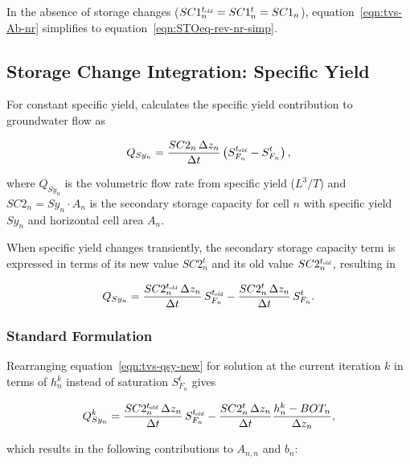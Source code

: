 \noindent In the absence of storage changes ($SC1_n^{t_\mathit{\kern -0.07em old}} = SC1_n^t = SC1_n$), equation~\ref{eqn:tvs-Ab-nr} simplifies to equation~\ref{eqn:STOeq-rev-nr-simp}.



\subsection{Storage Change Integration: Specific Yield} \label{sec:sci-sy}

For constant specific yield, \mf calculates the specific yield contribution to groundwater flow \citep[eq. 5--10]{modflow6gwf} as

\begin{equation}
	\label{eqn:tvs-qsy-original}
	Q_{Sy_n} = \frac{SC2_n \, \Delta z_n}{\Delta t} \left( S_{F_n}^{t_\mathit{\kern -0.07em old}} - S_{F_n}^t \right) ,
\end{equation}

\noindent where $Q_{Sy_n}$ is the volumetric flow rate from specific yield ($L^3/T$) and $SC2_n = Sy_n \cdot A_n$ is the secondary storage capacity for cell $n$ with specific yield $Sy_n$ and horizontal cell area $A_n$.

When specific yield changes transiently, the secondary storage capacity term is expressed in terms of its new value $SC2_n^t$ and its old value $SC2_n^{t_\mathit{\kern -0.07em old}}$, resulting in

\begin{equation}
	\label{eqn:tvs-qsy-new}
	Q_{Sy_n} = \frac{SC2_n^{t_\mathit{\kern -0.07em old}} \, \Delta z_n}{\Delta t} \, S_{F_n}^{t_\mathit{\kern -0.07em old}} - \frac{SC2_n^t \, \Delta z_n}{\Delta t} \, S_{F_n}^t .
\end{equation}


\subsubsection{Standard Formulation}

Rearranging equation~\ref{eqn:tvs-qsy-new} for solution at the current iteration $k$ in terms of $h_n^k$ instead of saturation $S_{F_n}^t$ gives

\begin{equation}
	\label{eqn:tvs-qsy-new-k}
	Q_{Sy_n}^k = \frac{SC2_n^{t_\mathit{\kern -0.07em old}} \, \Delta z_n}{\Delta t} \, S_{F_n}^{t_\mathit{\kern -0.07em old}} - \frac{SC2_n^t \, \Delta z_n}{\Delta t} \frac{h_n^k - BOT_n}{\Delta z_n} ,
\end{equation}

\noindent which results in the following contributions to $A_{n,n}$ and $b_n$:


